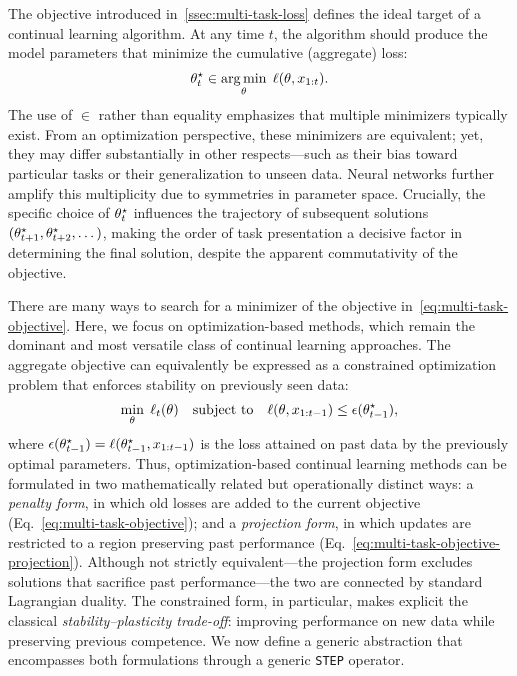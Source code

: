 \documentclass[10pt]{article} %
\DeclareMathOperator*{\argmin}{arg\,min}
\begin{document}
The objective introduced in~\cref{ssec:multi-task-loss} defines the ideal target of a continual learning algorithm.  
At any time $t$, the algorithm should produce the model parameters that minimize the cumulative (aggregate) loss:
\begin{align}
    \label{eq:multi-task-optimal2}
    \param_t^\star \in \argmin_\param \; \loss(\param, x_{1:t}).
\end{align}
The use of $\in$ rather than equality emphasizes that multiple minimizers typically exist.  
From an optimization perspective, these minimizers are equivalent; yet, they may differ substantially in other respects—such as their bias toward particular tasks or their generalization to unseen data.  
Neural networks further amplify this multiplicity due to symmetries in parameter space.  
Crucially, the specific choice of $\theta_t^\star$ influences the trajectory of subsequent solutions $(\theta_{t+1}^\star, \theta_{t+2}^\star, \dots)$, making the order of task presentation a decisive factor in determining the final solution, despite the apparent commutativity of the objective.

\vspace{0.5em}
There are many ways to search for a minimizer of the objective in~\cref{eq:multi-task-objective}.  
Here, we focus on optimization-based methods, which remain the dominant and most versatile class of continual learning approaches.  
The aggregate objective can equivalently be expressed as a constrained optimization problem that enforces stability on previously seen data:
\begin{align}
\label{eq:multi-task-objective-projection}
    \min_\theta \; \ell_t(\theta)
    \quad \text{subject to} \quad 
    \ell(\theta, x_{1:t-1}) \leq \epsilon(\theta_{t-1}^\star),
\end{align}
where $\epsilon(\theta_{t-1}^\star) = \ell(\theta_{t-1}^\star, x_{1:t-1})$ is the loss attained on past data by the previously optimal parameters.  
Thus, optimization-based continual learning methods can be formulated in two mathematically related but operationally distinct ways: a \emph{penalty form}, in which old losses are added to the current objective (Eq.~\ref{eq:multi-task-objective}); and a \emph{projection form}, in which updates are restricted to a region preserving past performance (Eq.~\ref{eq:multi-task-objective-projection}).
Although not strictly equivalent—the projection form excludes solutions that sacrifice past performance—the two are connected by standard Lagrangian duality.  
The constrained form, in particular, makes explicit the classical \emph{stability–plasticity trade-off}: improving performance on new data while preserving previous competence. 
We now define a generic abstraction that encompasses both formulations through a generic \texttt{STEP} operator.
\end{document}
